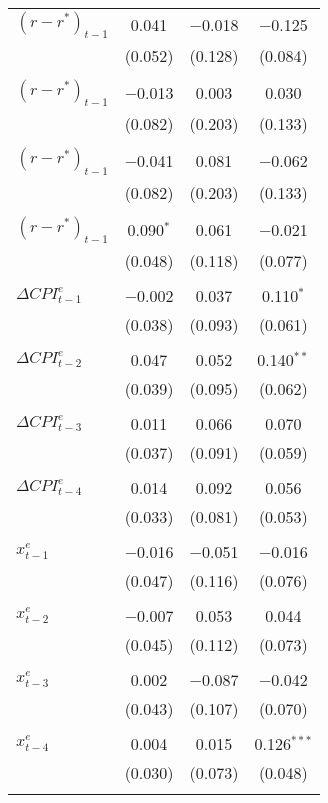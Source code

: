\documentclass[11pt]{article}
\begin{document}
\begin{table}[!htbp]
\begin{threeparttable}
\begin{tabular}{@{\extracolsep{5pt}}lccc}
    $\left(r-r^*\right)_{t-1}$ & 0.041 & $-$0.018 & $-$0.125 \\ 
    & (0.052) & (0.128) & (0.084) \\ 
    & & & \\ 
    $\left(r-r^*\right)_{t-1}$ & $-$0.013 & 0.003 & 0.030 \\ 
    & (0.082) & (0.203) & (0.133) \\ 
    & & & \\ 
    $\left(r-r^*\right)_{t-1}$ & $-$0.041 & 0.081 & $-$0.062 \\ 
    & (0.082) & (0.203) & (0.133) \\ 
    & & & \\ 
    $\left(r-r^*\right)_{t-1}$ & 0.090$^{*}$ & 0.061 & $-$0.021 \\ 
    & (0.048) & (0.118) & (0.077) \\ 
    & & & \\ 
    $\Delta\mathit{CPI}_{t-1}^e$ & $-$0.002 & 0.037 & 0.110$^{*}$ \\ 
    & (0.038) & (0.093) & (0.061) \\ 
    & & & \\ 
    $\Delta\mathit{CPI}_{t-2}^e$  & 0.047 & 0.052 & 0.140$^{**}$ \\ 
    & (0.039) & (0.095) & (0.062) \\ 
    & & & \\ 
    $\Delta\mathit{CPI}_{t-3}^e$  & 0.011 & 0.066 & 0.070 \\ 
    & (0.037) & (0.091) & (0.059) \\ 
    & & & \\ 
    $\Delta\mathit{CPI}_{t-4}^e$  & 0.014 & 0.092 & 0.056 \\ 
    & (0.033) & (0.081) & (0.053) \\ 
    & & & \\ 
   $x_{t-1}^e$ & $-$0.016 & $-$0.051 & $-$0.016 \\ 
    & (0.047) & (0.116) & (0.076) \\ 
    & & & \\ 
    $x_{t-2}^e$ & $-$0.007 & 0.053 & 0.044 \\ 
    & (0.045) & (0.112) & (0.073) \\ 
    & & & \\ 
    $x_{t-3}^e$ & 0.002 & $-$0.087 & $-$0.042 \\ 
    & (0.043) & (0.107) & (0.070) \\ 
    & & & \\ 
    $x_{t-4}^e$ & 0.004 & 0.015 & 0.126$^{***}$ \\ 
    & (0.030) & (0.073) & (0.048) \\ 
    & & & \\ 


\end{tabular}
\end{threeparttable}
\end{table}
\end{document}
